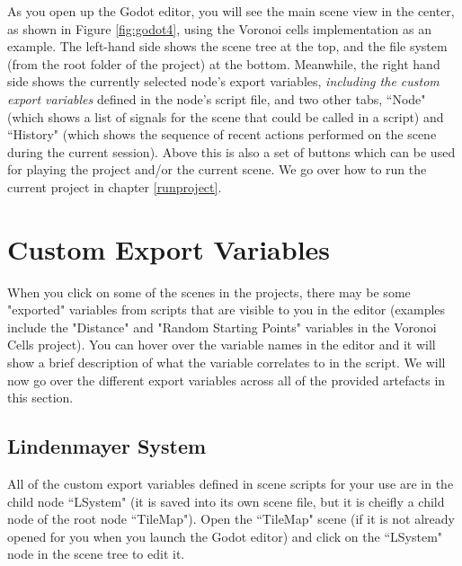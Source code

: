 As you open up the Godot editor, you will see the main scene view in the center, as shown in Figure \ref{fig:godot4}, using the Voronoi cells implementation as an example. The left-hand side shows the scene tree at the top, and the file system (from the root folder of the project) at the bottom. Meanwhile, the right hand side shows the currently selected node's export variables, \textit{including the custom export variables} defined in the node's script file, and two other tabs, ``Node" (which shows a list of signals for the scene that could be called in a script) and ``History" (which shows the sequence of recent actions performed on the scene during the current session). Above this is also a set of buttons which can be used for playing the project and/or the current scene. We go over how to run the current project in chapter \ref{runproject}.

\section{Custom Export Variables} 

When you click on some of the scenes in the projects, there may be some "exported" variables from scripts that are visible to you in the editor (examples include the "Distance" and "Random Starting Points" variables in the Voronoi Cells project). You can hover over the variable names in the editor and it will show a brief description of what the variable correlates to in the script. We will now go over the different export variables across all of the provided artefacts in this section.

\subsection{Lindenmayer System}

All of the custom export variables defined in scene scripts for your use are in the child node ``LSystem" (it is saved into its own scene file, but it is cheifly a child node of the root node ``TileMap"). Open the ``TileMap" scene (if it is not already opened for you when you launch the Godot editor) and click on the ``LSystem" node in the scene tree to edit it.

